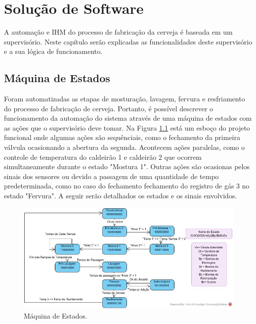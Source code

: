	\chapter{Solução de Software}
A automação e IHM do processo de fabricação da cerveja é baseada em um supervisório. Neste capítulo serão explicadas as funcionalidades deste supervisório e a sua lógica de funcionamento.


	\section{Máquina de Estados}
Foram automatizadas as etapas de mosturação, lavagem, fervura e resfriamento do processo de fabricação de cerveja. Portanto, é possível descrever o funcionamento da automação do sistema através de uma máquina de estados com as ações que o supervisório deve tomar. Na Figura \ref{fluxograma} está um esboço do projeto funcional onde algumas ações são sequênciais, como o fechamento da primeira válvula ocasionando a abertura da segunda. Acontecem ações paralelas, como o controle de temperatura do caldeirão 1 e caldeirão 2 que ocorrem simultaneamente durante o estado "Mostura 1". Outras ações são ocasionas pelos sinais dos sensores ou devido a passagem de uma quantidade de tempo predeterminada, como no caso do fechamento fechamento do registro de gás 3 no estado "Fervura".  A seguir serão detalhados os estados e os sinais envolvidos.

\begin{figure}[htb]
	\caption{\label{fluxograma}Máquina de Estados.}
	\begin{center}
	    \includegraphics[width=1\linewidth]{./img/MaquinadeEstados.JPG}
	\end{center}
\end{figure}

